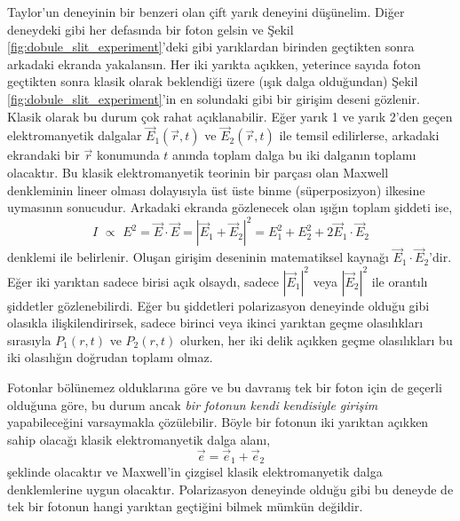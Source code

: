 \documentclass[a4paper,12pt, twoside]{article}
\begin{document}
Taylor'un deneyinin bir benzeri olan çift yarık deneyini düşünelim. Diğer deneydeki gibi her defasında bir foton gelsin ve Şekil \ref{fig:dobule_slit_experiment}'deki gibi yarıklardan birinden geçtikten sonra arkadaki ekranda yakalansın. Her iki yarıkta açıkken, yeterince sayıda foton geçtikten sonra klasik olarak beklendiği üzere (ışık dalga olduğundan) Şekil \ref{fig:dobule_slit_experiment}'in en solundaki gibi bir girişim deseni gözlenir. Klasik olarak bu durum çok rahat açıklanabilir. Eğer yarık 1 ve yarık 2'den geçen elektromanyetik dalgalar $\vec E_1(\vec r, t)$ ve $\vec E_2(\vec r, t)$ ile temsil edilirlerse, arkadaki ekrandaki bir $\vec r$ konumunda $t$ anında toplam dalga bu iki dalganın toplamı olacaktır. Bu klasik elektromanyetik teorinin bir parçası olan Maxwell denkleminin lineer olması dolayısıyla üst üste binme (süperposizyon) ilkesine uymasının sonucudur. Arkadaki ekranda gözlenecek olan ışığın toplam şiddeti ise,
\begin{equation}
I \,\, \propto\,\, E^2 = \vec E \cdot \vec E = |\vec E_1 + \vec E_2|^2 = E_1^2 + E_2^2 + 2\vec E_1 \cdot \vec E_2
\label{eq:foton_interference}
\end{equation}
denklemi ile belirlenir. Oluşan girişim deseninin matematiksel kaynağı $\vec E_1 \cdot \vec E_2$'dir. Eğer iki yarıktan sadece birisi açık olsaydı, sadece $|\vec E_1|^2$ veya $|\vec E_2|^2$ ile orantılı şiddetler gözlenebilirdi. Eğer bu şiddetleri polarizasyon deneyinde olduğu gibi olasıkla ilişkilendirirsek, sadece birinci veya ikinci yarıktan geçme olasılıkları sırasıyla $P_1(r,t)$ ve $P_2(r,t)$ olurken, her iki delik açıkken geçme olasılıkları bu iki olasılığın doğrudan toplamı olmaz.

Fotonlar bölünemez olduklarına göre ve bu davranış tek bir foton için de geçerli olduğuna göre, bu durum ancak \emph{bir fotonun kendi kendisiyle girişim} yapabileceğini varsaymakla çözülebilir. Böyle bir fotonun iki yarıktan açıkken sahip olacağı klasik elektromanyetik dalga alanı,
\begin{equation}
\vec e = \vec e_1 + \vec e_2
\label{eq:single_foton_em_field}
\end{equation}
şeklinde olacaktır ve Maxwell'in çizgisel klasik elektromanyetik dalga denklemlerine uygun olacaktır. Polarizasyon deneyinde olduğu gibi bu deneyde de tek bir fotonun hangi yarıktan geçtiğini bilmek mümkün değildir.
\end{document}
